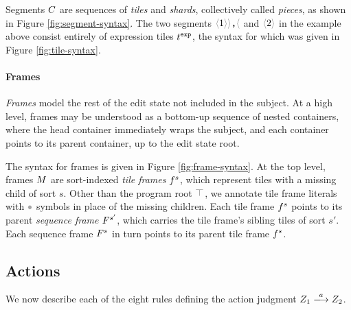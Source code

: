Segments $C$ are sequences of \emph{tiles}
and \emph{shards}, collectively called \emph{pieces},
as shown in Figure \ref{fig:segment-syntax}.
The two segments $\optile{\snumlit{1}}\bintile{\tprod}$ and
$\optile{\snumlit{2}}$ in the example above consist
entirely of expression tiles $t^{\texttt{exp}}$,
the syntax for which was given in Figure \ref{fig:tile-syntax}.







\paragraph{Frames}
\emph{Frames} model the rest of the edit state not included
in the subject.
At a high level, frames may be understood as a
bottom-up sequence of nested containers, where
the head container immediately
wraps the subject, and each container points to its
parent container, up to the edit state root.

The syntax for frames is given in Figure \ref{fig:frame-syntax}.
At the top level, frames $M$ are sort-indexed \emph{tile frames}
$f^s$, which represent tiles with a missing child of
sort $s$.
Other than the program root $\froot$, we annotate tile frame literals
with $\framehole$ symbols in place of the missing children.
Each tile frame $f^s$ points to its parent
\emph{sequence frame} $F^{s'}$, which carries the tile frame's
sibling tiles of sort $s'$.
Each sequence frame $F^s$ in turn points to its parent
tile frame $f^s$.


\subsection{Actions}

We now describe each of the eight rules defining the
action judgment $\performAction{\editState_1}{\action}{\editState_2}$.





